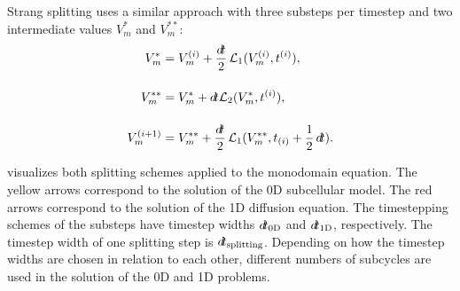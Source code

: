 Strang splitting uses a similar approach with three substeps per timestep and two intermediate values $V_m^{\ast}$ and $V_m^{\ast\ast}$:
%
\begin{subequations}\label{eq:monodomain_strang}
  \begin{align}
    V_m^{\ast} &= V_m^{(i)} + \dfrac{\dt}{2} \mathcal{L}_1(V_m^{(i)},t^{(i)}),\\[4mm]
    V_m^{\ast\ast} &= V_m^{\ast} + \dt \mathcal{L}_2(V_m^{\ast},t^{(i)}),\\[4mm]
    V_m^{(i+1)} &= V_m^{\ast\ast} + \dfrac{\dt}{2} \mathcal{L}_1(V_m^{\ast\ast},t_{(i)}+\dfrac12 \dt).
  \end{align}
\end{subequations}
%

 visualizes both splitting schemes applied to the monodomain equation. 
The yellow arrows correspond to the solution of the 0D subcellular model. The red arrows correspond to the solution of the 1D diffusion equation. The timestepping schemes of the substeps have timestep widths $\dt_\text{0D}$ and $\dt_\text{1D}$, respectively. The timestep width of one splitting step is $\dt_\text{splitting}$. Depending on how the timestep widths are chosen in relation to each other, different numbers of subcycles are used in the solution of the 0D and 1D problems.

